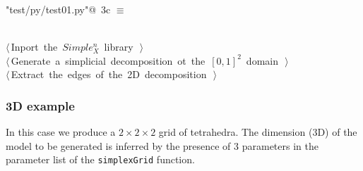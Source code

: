 \documentclass[11pt,oneside]{article}	%
\begin{document}
\begin{flushleft} \small \label{scrap4}
\protect{}\verb@"test/py/test01.py"@\nobreak\ {\footnotesize 3c }$\equiv$
\vspace{-1ex}
\begin{list}{}{} \item
\mbox{}\verb@@\\
\mbox{}\verb@@\hbox{$\langle\,$Inport the $Simple_X^n$ library\nobreak\ {\footnotesize {}}$\,\rangle$}\verb@@\\
\mbox{}\verb@@\hbox{$\langle\,$Generate a simplicial decomposition ot the $[0,1]^2$ domain\nobreak\ {\footnotesize {}}$\,\rangle$}\verb@@\\
\mbox{}\verb@@\hbox{$\langle\,$Extract the edges of the 2D decomposition\nobreak\ {\footnotesize {}}$\,\rangle$}\verb@@\\
\mbox{}\verb@@{\NWsep}
\end{list}
\vspace{-2ex}
\end{flushleft}

\subsubsection{3D example}

In this case we produce a $2\times 2\times 2$ grid of tetrahedra. The dimension (3D) of the model to be generated is inferred by the presence of 3 parameters in the parameter list of the \texttt{simplexGrid} function. 
\end{document}
